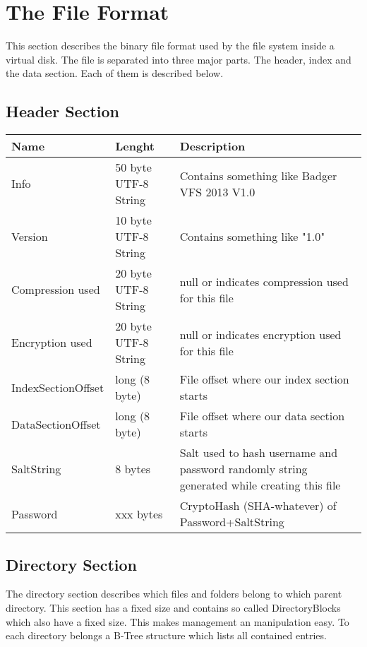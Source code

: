 
\section{The File Format}


This section describes the binary file format used by the file system inside a
virtual disk.
The file is separated into three major parts. The header, index and the data
section. Each of them is described below.

\subsection{Header Section}

\begin{tabular}{|l|l|p{5cm}|}
\hline
  \textbf{Name} & \textbf{Lenght} & \textbf{Description}
\\  \hline
  Info & 50 byte UTF-8 String & Contains something like Badger VFS 2013 V1.0 
\\ \hline
  Version & 10 byte UTF-8 String & Contains something like "1.0"
\\ \hline
  Compression used & 20 byte UTF-8 String & null or indicates compression used for this file
\\ \hline
  Encryption used & 20 byte UTF-8 String & null or indicates encryption used for this file
\\ \hline
 IndexSectionOffset & long (8 byte) &  File offset where our index section
 starts \\ \hline
 DataSectionOffset & long (8 byte) &  File offset where our data section starts
\\ \hline
 SaltString & 8 bytes  & Salt used to hash username and password randomly string generated while creating this
   file
 \\ \hline
  Password & xxx bytes  & CryptoHash (SHA-whatever) of Password+SaltString
\\ \hline

\end{tabular}


\subsection{Directory Section}

The directory section describes which files and folders belong to which parent directory. This section has a fixed size and contains so called DirectoryBlocks which also have a fixed size. This makes management an manipulation easy. To each directory belongs a B-Tree structure which lists all contained entries.



